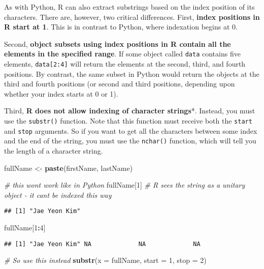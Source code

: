 \documentclass[
]{book}
\newenvironment{Shaded}{\begin{snugshade}}{\end{snugshade}}
\newcommand{\CommentTok}[1]{\textcolor[rgb]{0.56,0.35,0.01}{\textit{#1}}}
\newcommand{\DataTypeTok}[1]{\textcolor[rgb]{0.13,0.29,0.53}{#1}}
\newcommand{\DecValTok}[1]{\textcolor[rgb]{0.00,0.00,0.81}{#1}}
\newcommand{\KeywordTok}[1]{\textcolor[rgb]{0.13,0.29,0.53}{\textbf{#1}}}
\newcommand{\NormalTok}[1]{#1}
\newcommand{\OperatorTok}[1]{\textcolor[rgb]{0.81,0.36,0.00}{\textbf{#1}}}
\newcommand{\StringTok}[1]{\textcolor[rgb]{0.31,0.60,0.02}{#1}}
\begin{document}
As with Python, R can also extract substrings based on the index position of its characters. There are, however, two critical differences. First, \textbf{index positions in R start at 1}. This is in contrast to Python, where indexation begins at 0.

Second, \textbf{object subsets using index positions in R contain all the elements in the specified range}. If some object called \texttt{data} contains five elements, \texttt{data{[}2:4{]}} will return the elements at the second, third, and fourth positions. By contrast, the same subset in Python would return the objects at the third and fourth positions (or second and third positions, depending upon whether your index starts at 0 or 1).

Third, \textbf{R does not allow indexing of character strings}*. Instead, you must use the \texttt{substr()} function. Note that this function must receive both the \texttt{start} and \texttt{stop} arguments. So if you want to get all the characters between some index and the end of the string, you must use the \texttt{nchar()} function, which will tell you the length of a character string.

\begin{Shaded}
\begin{Highlighting}[]
\NormalTok{fullName \textless{}{-}}\StringTok{ }\KeywordTok{paste}\NormalTok{(firstName, lastName)}

\CommentTok{\# this won\textquotesingle{}t work like in Python}
\NormalTok{fullName[}\DecValTok{1}\NormalTok{] }\CommentTok{\# R sees the string as a unitary object {-} it can\textquotesingle{}t be indexed this way}
\end{Highlighting}
\end{Shaded}

\begin{verbatim}
## [1] "Jae Yeon Kim"
\end{verbatim}

\begin{Shaded}
\begin{Highlighting}[]
\NormalTok{fullName[}\DecValTok{1}\OperatorTok{:}\DecValTok{4}\NormalTok{]}
\end{Highlighting}
\end{Shaded}

\begin{verbatim}
## [1] "Jae Yeon Kim" NA             NA             NA
\end{verbatim}

\begin{Shaded}
\begin{Highlighting}[]
\CommentTok{\# So use this instead}
\KeywordTok{substr}\NormalTok{(}\DataTypeTok{x =}\NormalTok{ fullName, }\DataTypeTok{start =} \DecValTok{1}\NormalTok{, }\DataTypeTok{stop =} \DecValTok{2}\NormalTok{)}
\end{Highlighting}
\end{Shaded}
\end{document}
